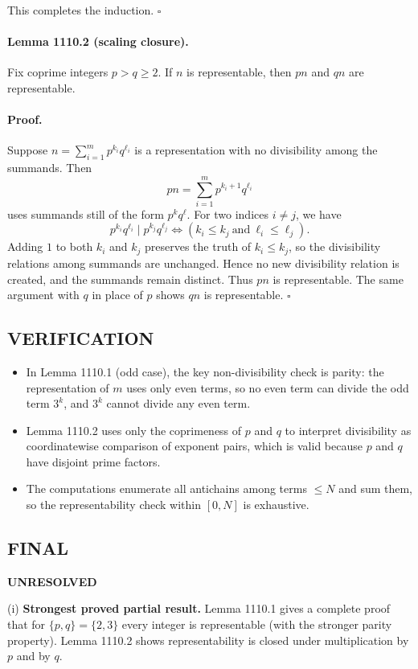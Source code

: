 This completes the induction. \hfill $\square$

\paragraph{Lemma 1110.2 (scaling closure).}
Fix coprime integers $p>q\ge 2$.
If $n$ is representable, then $pn$ and $qn$ are representable.

\paragraph{Proof.}
Suppose $n=\sum_{i=1}^m p^{k_i}q^{\ell_i}$ is a representation with no divisibility among the summands.
Then
\[pn=\sum_{i=1}^m p^{k_i+1}q^{\ell_i}\]
uses summands still of the form $p^k q^\ell$.
For two indices $i\ne j$, we have
\[p^{k_i}q^{\ell_i}\mid p^{k_j}q^{\ell_j} \iff (k_i\le k_j\ \text{and}\ \ell_i\le \ell_j).
\]
Adding $1$ to both $k_i$ and $k_j$ preserves the truth of $k_i\le k_j$, so the divisibility relations among summands are unchanged.
Hence no new divisibility relation is created, and the summands remain distinct.
Thus $pn$ is representable.
The same argument with $q$ in place of $p$ shows $qn$ is representable. \hfill $\square$

\subsection*{VERIFICATION}
\begin{itemize}
\item In Lemma 1110.1 (odd case), the key non-divisibility check is parity: the representation of $m$ uses only even terms, so no even term can divide the odd term $3^k$, and $3^k$ cannot divide any even term.
\item Lemma 1110.2 uses only the coprimeness of $p$ and $q$ to interpret divisibility as coordinatewise comparison of exponent pairs, which is valid because $p$ and $q$ have disjoint prime factors.
\item The computations enumerate all antichains among terms $\le N$ and sum them, so the representability check within $[0,N]$ is exhaustive.
\end{itemize}

\subsection*{FINAL}
\textbf{UNRESOLVED}

(i) \textbf{Strongest proved partial result.}
Lemma 1110.1 gives a complete proof that for $\{p,q\}=\{2,3\}$ every integer is representable (with the stronger parity property).
Lemma 1110.2 shows representability is closed under multiplication by $p$ and by $q$.

